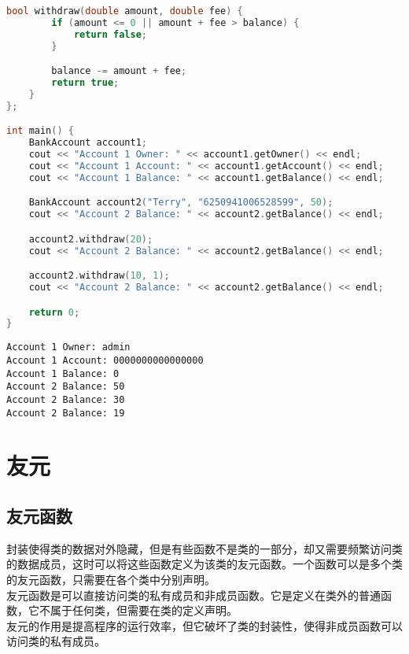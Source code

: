 \begin{lstlisting}[language=C++]
    bool withdraw(double amount, double fee) {
        if (amount <= 0 || amount + fee > balance) {
            return false;
        }

        balance -= amount + fee;
        return true;
    }
};

int main() {
    BankAccount account1;
    cout << "Account 1 Owner: " << account1.getOwner() << endl;
    cout << "Account 1 Account: " << account1.getAccount() << endl;
    cout << "Account 1 Balance: " << account1.getBalance() << endl;

    BankAccount account2("Terry", "6250941006528599", 50);
    cout << "Account 2 Balance: " << account2.getBalance() << endl;

    account2.withdraw(20);
    cout << "Account 2 Balance: " << account2.getBalance() << endl;

    account2.withdraw(10, 1);
    cout << "Account 2 Balance: " << account2.getBalance() << endl;

    return 0;
}
\end{lstlisting}

\begin{tcolorbox}
    \begin{verbatim}
Account 1 Owner: admin
Account 1 Account: 0000000000000000
Account 1 Balance: 0
Account 2 Balance: 50
Account 2 Balance: 30
Account 2 Balance: 19
	\end{verbatim}
\end{tcolorbox}

\newpage

\section{友元}

\subsection{友元函数}

封装使得类的数据对外隐藏，但是有些函数不是类的一部分，却又需要频繁访问类的数据成员，这时可以将这些函数定义为该类的友元函数。一个函数可以是多个类的友元函数，只需要在各个类中分别声明。\\

友元函数是可以直接访问类的私有成员和非成员函数。它是定义在类外的普通函数，它不属于任何类，但需要在类的定义声明。\\

友元的作用是提高程序的运行效率，但它破坏了类的封装性，使得非成员函数可以访问类的私有成员。\\


